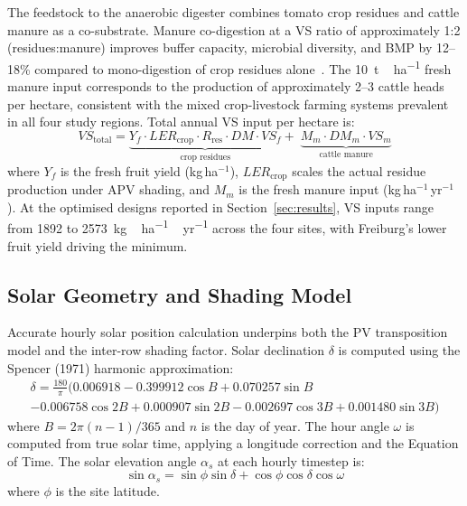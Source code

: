 The feedstock to the anaerobic digester combines tomato crop residues
and cattle manure as a co-substrate. Manure co-digestion at a VS ratio
of approximately 1:2 (residues:manure) improves buffer capacity,
microbial diversity, and BMP by 12--18\% compared to mono-digestion of
crop residues alone~\citep{pilarski2025}. The \SI{10}{t\,ha^{-1}} fresh
manure input corresponds to the production of approximately 2--3 cattle
heads per hectare, consistent with the mixed crop-livestock farming
systems prevalent in all four study regions. Total annual VS input per
hectare is:
\begin{equation}
    VS_{\text{total}} =
    \underbrace{Y_f \cdot LER_{\text{crop}} \cdot
    R_{\text{res}} \cdot DM \cdot VS_f}_{\text{crop residues}}
    +\;
    \underbrace{M_m \cdot DM_m \cdot VS_m}_{\text{cattle manure}}
    \label{eq:vs}
\end{equation}
where $Y_f$ is the fresh fruit yield (kg\,ha$^{-1}$), $LER_{\text{crop}}$
scales the actual residue production under APV shading, and $M_m$
is the fresh manure input (kg\,ha$^{-1}$\,yr$^{-1}$). At the optimised
designs reported in Section~\ref{sec:results}, VS inputs range from
\SI{1892}{} to \SI{2573}{kg\,ha^{-1}\,yr^{-1}} across the four sites,
with Freiburg's lower fruit yield driving the minimum.

\subsection{Solar Geometry and Shading Model}
\label{sec:shading}

\hspace{1cm}Accurate hourly solar position calculation underpins both
the PV transposition model and the inter-row shading factor. Solar
declination $\delta$ is computed using the Spencer (1971) harmonic
approximation:
\begin{multline}
	\delta = \frac{180}{\pi}\Big(
	0.006918
	- 0.399912\cos B
	+ 0.070257\sin B \\
	- 0.006758\cos 2B
	+ 0.000907\sin 2B
	- 0.002697\cos 3B
	+ 0.001480\sin 3B
	\Big)
	\label{eq:declination}
\end{multline}
where $B = 2\pi(n-1)/365$ and $n$ is the day of year. The hour angle
$\omega$ is computed from true solar time, applying a longitude correction
and the Equation of Time. The solar elevation angle $\alpha_s$ at each
hourly timestep is:
\begin{equation}
    \sin\alpha_s = \sin\phi\sin\delta
        + \cos\phi\cos\delta\cos\omega
    \label{eq:elevation}
\end{equation}
where $\phi$ is the site latitude.

